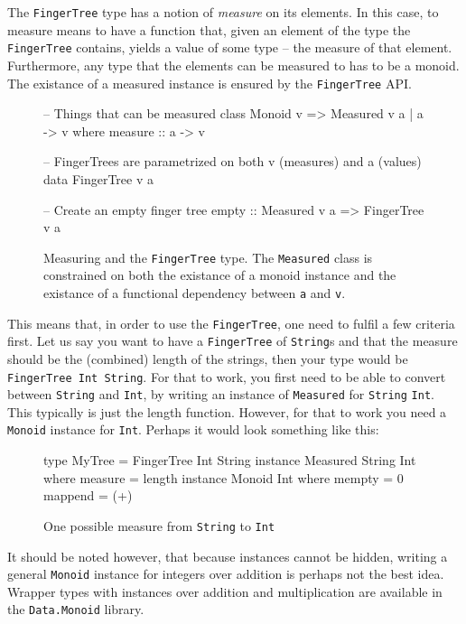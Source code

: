 \documentclass[a4paper,12pt,twosided]{report}
\begin{document}
The \texttt{FingerTree} type has a notion of \textit{measure} on its elements.
In this case, to measure means to have a function that, given an element of the
type the \texttt{FingerTree} contains, yields a value of some type -- the
measure of that element. Furthermore, any type that the elements can be measured
to has to be a monoid. The existance of a measured instance is ensured by the
\texttt{FingerTree} API. 

\begin{figure}[H]
\begin{code}
-- Things that can be measured
class Monoid v => Measured v a | a -> v where
    measure :: a -> v

-- FingerTrees are parametrized on both v (measures) and a (values)
data FingerTree v a

-- Create an empty finger tree
empty :: Measured v a => FingerTree v a
\end{code}
\caption{Measuring and the \texttt{FingerTree} type. The \texttt{Measured} class
is constrained on both the existance of a monoid instance and the existance of a
functional dependency between \texttt{a} and \texttt{v}.}
\end{figure}

This means that, in order to use the \texttt{FingerTree}, one need to fulfil a
few criteria first. Let us say you want to have a \texttt{FingerTree} of
\texttt{String}s and that the measure should be the (combined) length of the
strings, then your type would be \texttt{FingerTree Int String}. For that to
work, you first need to be able to convert between \texttt{String} and
\texttt{Int}, by writing an instance of \texttt{Measured} for \texttt{String}
\texttt{Int}. This typically is just the length function. However, for that to
work you need a \texttt{Monoid} instance for \texttt{Int}. Perhaps it would look
something like this:

\begin{figure}[H]
\begin{code}
type MyTree = FingerTree Int String
instance Measured String Int where
    measure = length
instance Monoid Int where
    mempty = 0
    mappend = (+)
\end{code}
\caption{One possible measure from \texttt{String} to \texttt{Int}}
\end{figure}
It should be noted however, that because instances cannot be hidden, writing a
general \texttt{Monoid} instance for integers over addition is perhaps not the
best idea.  Wrapper types with instances over addition and multiplication are
available in the \texttt{Data.Monoid} library. 
\end{document}
